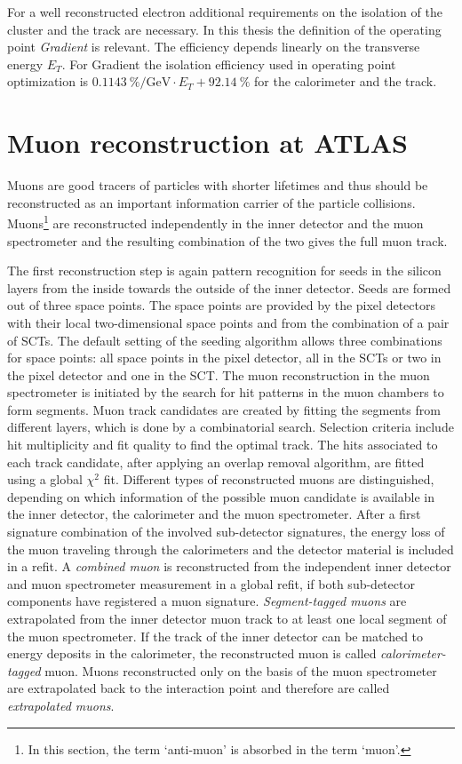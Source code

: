 For a well reconstructed electron additional requirements on the isolation of the cluster and the track are necessary. In this thesis the definition of the operating point \textit{Gradient} is relevant. The efficiency depends linearly on the transverse energy $E_T$. For Gradient the isolation efficiency used in operating point optimization is $\SI{0.1143}{\percent\per\giga\electronvolt}\cdot E_T+\SI{92.14}{\percent}$ for the calorimeter and the track. \cite{ePerformance}
%
%
\section{Muon reconstruction at ATLAS}
Muons are good tracers of particles with shorter lifetimes and thus should be reconstructed as an important information carrier of the particle collisions. Muons\footnote{In this section, the term `anti-muon' is absorbed in the term `muon'.} are reconstructed independently in the inner detector and the muon spectrometer and the resulting combination of the two gives the full muon track. \cite{muPerformance}\par
The first reconstruction step is again pattern recognition for seeds in the silicon layers from the inside towards the outside of the inner detector. Seeds are formed out of three space points. The space points are provided by the pixel detectors with their local two-dimensional space points and from the combination of a pair of SCTs. The default setting of the seeding algorithm allows three combinations for space points: all space points in the pixel detector, all in the SCTs or two in the pixel detector and one in the SCT. \cite{muInner}\newline
The muon reconstruction in the muon spectrometer is initiated by the search for hit patterns in the muon chambers to form segments. Muon track candidates are created by fitting the segments from different layers, which is done by a combinatorial search. Selection criteria include hit multiplicity and fit quality to find the optimal track. The hits associated to each track candidate, after applying an overlap removal algorithm, are fitted using a global $\chi^2$ fit. \cite{muPerformance}\newline
Different types of reconstructed muons are distinguished, depending on which information of the possible muon candidate is available in the inner detector, the calorimeter and the muon spectrometer. After a first signature combination of the involved sub-detector signatures, the energy loss of the muon traveling through the calorimeters and the detector material is included in a refit. A \textit{combined muon} is reconstructed from the independent inner detector and muon spectrometer measurement in a global refit, if both sub-detector components have registered a muon signature. \textit{Segment-tagged muons} are extrapolated from the inner detector muon track to at least one local segment of the muon spectrometer. If the track of the inner detector can be matched to energy deposits in the calorimeter, the reconstructed muon is called \textit{calorimeter-tagged} muon. Muons reconstructed only on the basis of the muon spectrometer are extrapolated back to the interaction point and therefore are called \textit{extrapolated muons}.\cite{muPerformance}\newline
